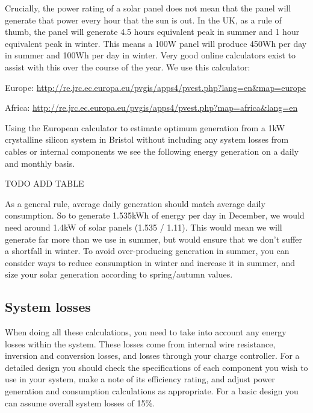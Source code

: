 \documentclass{article}
\theoremstyle{definition}
\theoremstyle{definition}
\theoremstyle{remark}
\begin{document}
    Crucially, the power rating of a solar panel does not mean that the panel will generate that power every hour that the sun is out. In the UK, as a rule of thumb, the panel will generate 4.5 hours equivalent peak in summer and 1 hour equivalent peak in winter. This means a 100W panel will produce 450Wh per day in summer and 100Wh per day in winter. Very good online calculators exist to assist with this over the course of the year. We use this calculator:

    Europe: \href{http://re.jrc.ec.europa.eu/pvgis/apps4/pvest.php?lang=en\&map=europe}{http://re.jrc.ec.europa.eu/pvgis/apps4/pvest.php?lang=en\&map=europe}

    Africa: \href{http://re.jrc.ec.europa.eu/pvgis/apps4/pvest.php?map=africa\&lang=en}{http://re.jrc.ec.europa.eu/pvgis/apps4/pvest.php?map=africa\&lang=en}

    Using the European calculator to estimate optimum generation from a 1kW crystalline silicon system in Bristol without including any system losses from cables or internal components we see the following energy generation on a daily and monthly basis.

    TODO ADD TABLE

    As a general rule, average daily generation should match average daily consumption. So to generate 1.535kWh of energy per day in December, we would need around 1.4kW of solar panels (1.535 / 1.11). This would mean we will generate far more than we use in summer, but would ensure that we don’t suffer a shortfall in winter. To avoid over-producing generation in summer, you can consider ways to reduce consumption in winter and increase it in summer, and size your solar generation according to spring/autumn values.
  

  {\color{blue}\subsection{System losses}} %
  \label{sub:system_losses}

    When doing all these calculations, you need to take into account any energy losses within the system. These losses come from internal wire resistance, inversion and conversion losses, and losses through your charge controller. For a detailed design you should check the specifications of each component you wish to use in your system, make a note of its efficiency rating, and adjust power generation and consumption calculations as appropriate. For a basic design you can assume overall system losses of 15\%.
\end{document}
